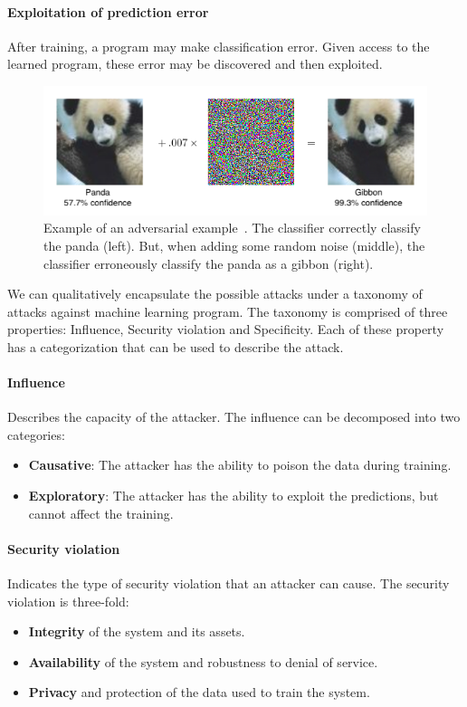 \paragraph{Exploitation of prediction error} After training, a program may make classification error. Given access to the learned program, these error may be discovered and then exploited.

\begin{figure}
    \centering
    \includegraphics[width=\linewidth]{adversarial_example.png}
    \caption{Example of an adversarial example~\cite{goodfellow_explaining}. The classifier correctly classify the panda (left). But, when adding some random noise (middle), the classifier erroneously classify the panda as a gibbon (right).}
    \label{fig:adv_class}
\end{figure}

We can qualitatively encapsulate the possible attacks under a taxonomy of attacks against machine learning program. The taxonomy is comprised of three properties: Influence, Security violation and Specificity. Each of these property has a categorization that can be used to describe the attack.
\paragraph{Influence} Describes the capacity of the attacker. The influence can be decomposed into two categories:
\begin{itemize}
    \item \textbf{Causative}: The attacker has the ability to poison the data during training.
    \item \textbf{Exploratory}: The attacker has the ability to exploit the predictions, but cannot affect the training.
\end{itemize}
\paragraph{Security violation} Indicates the type of security violation that an attacker can cause. The security violation is three-fold:
\begin{itemize}
    \item \textbf{Integrity} of the system and its assets.
    \item \textbf{Availability} of the system and robustness to denial of service.
    \item \textbf{Privacy} and protection of the data used to train the system.
\end{itemize}
